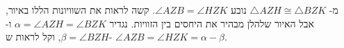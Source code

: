 %

מ-%
$\triangle AZH \cong \triangle BZK$
נובע
$\angle AZB = \angle HZK$.
קשה לראות את השוויונות הללו באיור, אבל האיור שלהלן מבהיר את היחסים בין הזוויות. נגדיר
$\alpha = \angle AZH = \angle BZK$
ו-%
$\beta = \angle BZH$,
וקל לראות ש-%
$\angle AZB = \angle HZK = \alpha - \beta$.


